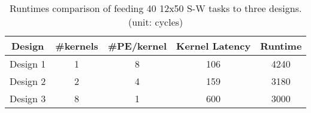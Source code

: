 \begin{table} [!hbp]
\centering

\caption{Runtimes comparison of feeding 40 12x50 S-W tasks to three designs. (unit: cycles)}
\label{tab:example}
\begin{tabular}
{|c|c|c|c|c|} \hline \hline
{Design}&{\#kernels}&{\#PE/kernel}&{Kernel Latency}&{Runtime}\\
\hline
{Design 1}&{1}&{8}&{106}&{4240}\\
{Design 2}&{2}&{4}&{159}&{3180}\\
{Design 3}&{8}&{1}&{600}&{3000}\\
\hline
\end{tabular}
\end{table}

